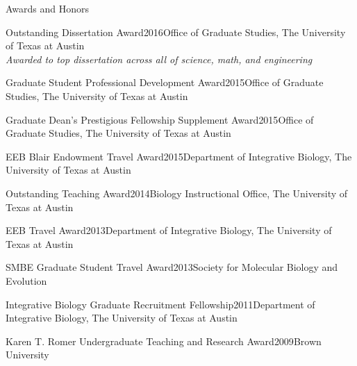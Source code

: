 \documentclass{resume} %
\begin{document}
\vspace*{0.35cm}
\begin{rSection}{Awards and Honors}
\vspace*{0.25cm}


\begin{rSubsection}{President's Award for Excellence in Innovative Instructional Delivery}{2021}{Faculty Center for Teaching Excellence, Rowan University}}}{}
\end{rSubsection}

\begin{rSubsection}{Outstanding Dissertation Award}{2016}{Office of Graduate Studies, The University of Texas at Austin \\ \emph{\footnotesize{Awarded to top dissertation across all of science, math, and engineering}}}{}
\end{rSubsection}

\begin{rSubsection}{Graduate Student Professional Development Award}{2015}{Office of Graduate Studies, The University of Texas at Austin}{}
\end{rSubsection}

\begin{rSubsection}{Graduate Dean's Prestigious Fellowship Supplement Award}{2015}{Office of Graduate Studies, The University of Texas at Austin}{}
\end{rSubsection}

\begin{rSubsection}{EEB Blair Endowment Travel Award}{2015}{Department of Integrative Biology, The University of Texas at Austin}{}
\end{rSubsection}

\begin{rSubsection}{Outstanding Teaching Award}{2014}{Biology Instructional Office, The University of Texas at Austin}{}
\end{rSubsection}

\begin{rSubsection}{EEB Travel Award}{2013}{Department of Integrative Biology, The University of Texas at Austin}{}
\end{rSubsection}

\begin{rSubsection}{SMBE Graduate Student Travel Award}{2013}{Society for Molecular Biology and Evolution}{}
\end{rSubsection}

\begin{rSubsection}{Integrative Biology Graduate Recruitment Fellowship}{2011}{Department of Integrative Biology, The University of Texas at Austin}{}
\end{rSubsection}

\begin{rSubsection}{Karen T. Romer Undergraduate Teaching and Research Award}{2009}{Brown University}{}
\end{rSubsection}


\end{rSection}
\end{document}
